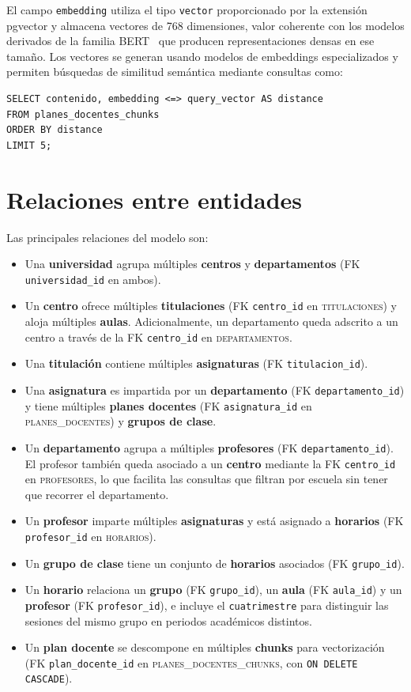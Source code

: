 El campo \texttt{embedding} utiliza el tipo \texttt{vector} proporcionado por la extensión pgvector y almacena vectores de 768 dimensiones, valor coherente con los modelos derivados de la familia BERT~\cite{devlin2019bert} que producen representaciones densas en ese tamaño. Los vectores se generan usando modelos de embeddings especializados y permiten búsquedas de similitud semántica mediante consultas como:

\begin{verbatim}
SELECT contenido, embedding <=> query_vector AS distance
FROM planes_docentes_chunks
ORDER BY distance
LIMIT 5;
\end{verbatim}

\section{Relaciones entre entidades}\label{sec:relaciones}

Las principales relaciones del modelo son:

\begin{itemize}
    \item Una \textbf{universidad} agrupa múltiples \textbf{centros} y \textbf{departamentos} (FK \texttt{universidad\_id} en ambos).
    \item Un \textbf{centro} ofrece múltiples \textbf{titulaciones} (FK \texttt{centro\_id} en \textsc{titulaciones}) y aloja múltiples \textbf{aulas}. Adicionalmente, un departamento queda adscrito a un centro a través de la FK \texttt{centro\_id} en \textsc{departamentos}.
    \item Una \textbf{titulación} contiene múltiples \textbf{asignaturas} (FK \texttt{titulacion\_id}).
    \item Una \textbf{asignatura} es impartida por un \textbf{departamento} (FK \texttt{departamento\_id}) y tiene múltiples \textbf{planes docentes} (FK \texttt{asignatura\_id} en \textsc{planes\_docentes}) y \textbf{grupos de clase}.
    \item Un \textbf{departamento} agrupa a múltiples \textbf{profesores} (FK \texttt{departamento\_id}). El profesor también queda asociado a un \textbf{centro} mediante la FK \texttt{centro\_id} en \textsc{profesores}, lo que facilita las consultas que filtran por escuela sin tener que recorrer el departamento.
    \item Un \textbf{profesor} imparte múltiples \textbf{asignaturas} y está asignado a \textbf{horarios} (FK \texttt{profesor\_id} en \textsc{horarios}).
    \item Un \textbf{grupo de clase} tiene un conjunto de \textbf{horarios} asociados (FK \texttt{grupo\_id}).
    \item Un \textbf{horario} relaciona un \textbf{grupo} (FK \texttt{grupo\_id}), un \textbf{aula} (FK \texttt{aula\_id}) y un \textbf{profesor} (FK \texttt{profesor\_id}), e incluye el \texttt{cuatrimestre} para distinguir las sesiones del mismo grupo en periodos académicos distintos.
    \item Un \textbf{plan docente} se descompone en múltiples \textbf{chunks} para vectorización (FK \texttt{plan\_docente\_id} en \textsc{planes\_docentes\_chunks}, con \texttt{ON DELETE CASCADE}).
\end{itemize}

